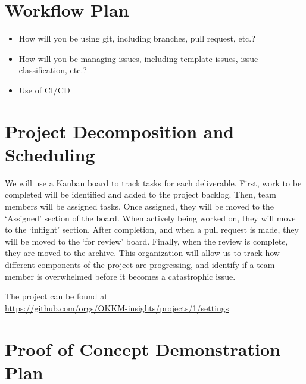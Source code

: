 \documentclass{article}
\begin{document}
\section{Workflow Plan}

\begin{itemize}
	\item How will you be using git, including branches, pull request, etc.?
	\item How will you be managing issues, including template issues, issue
	classification, etc.?
  \item Use of CI/CD
\end{itemize}

\section{Project Decomposition and Scheduling}


We will use a Kanban board to track tasks for each deliverable. First, work to be completed will be identified and added to the project backlog.
Then, team members will be assigned tasks. Once assigned, they will be moved to the `Assigned' section of the board. When actively being worked on, they will
move to the `inflight' section. After completion, and when a pull request is made, they will be moved to the `for review' board. Finally, when the review is
complete, they are moved to the archive. This organization will allow us to track how different components of the project are progressing, and identify
if a team member is overwhelmed before it becomes a catastrophic issue.

The project can be found at \\\url{https://github.com/orgs/OKKM-insights/projects/1/settings}


\section{Proof of Concept Demonstration Plan}
\end{document}
